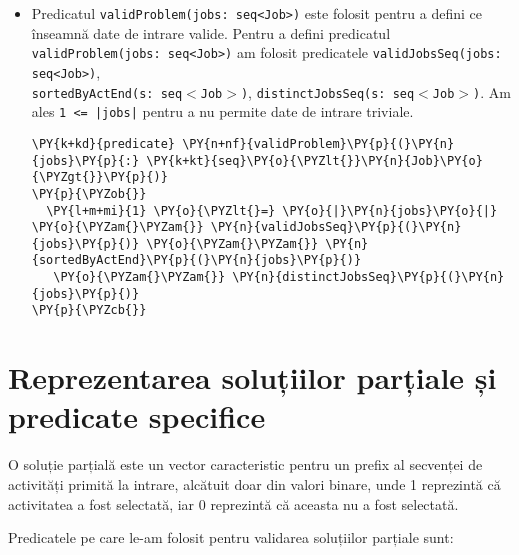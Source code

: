 \begin{itemize}
\begin{Verbatim}[commandchars=\\\{\}, fontsize=\footnotesize]
\PY{p}{\PYZcb{}}
\end{Verbatim}
\item Predicatul \texttt{validProblem(jobs: seq<Job>)} este folosit pentru a defini ce înseamnă date de intrare valide. Pentru a defini predicatul \texttt{validProblem(jobs: seq<Job>)} am folosit predicatele \texttt{validJobsSeq(jobs: seq<Job>)}, \\\texttt{sortedByActEnd(s: seq$<$Job$>$)}, \texttt{distinctJobsSeq(s: seq$<$Job$>$)}. Am ales \texttt{1 <= |jobs|} pentru a nu permite date de intrare triviale. 

\begin{Verbatim}[commandchars=\\\{\}, fontsize=\footnotesize]
\PY{k+kd}{predicate} \PY{n+nf}{validProblem}\PY{p}{(}\PY{n}{jobs}\PY{p}{:} \PY{k+kt}{seq}\PY{o}{\PYZlt{}}\PY{n}{Job}\PY{o}{\PYZgt{}}\PY{p}{)}
\PY{p}{\PYZob{}}
  \PY{l+m+mi}{1} \PY{o}{\PYZlt{}=} \PY{o}{|}\PY{n}{jobs}\PY{o}{|} \PY{o}{\PYZam{}\PYZam{}} \PY{n}{validJobsSeq}\PY{p}{(}\PY{n}{jobs}\PY{p}{)} \PY{o}{\PYZam{}\PYZam{}} \PY{n}{sortedByActEnd}\PY{p}{(}\PY{n}{jobs}\PY{p}{)}
   \PY{o}{\PYZam{}\PYZam{}} \PY{n}{distinctJobsSeq}\PY{p}{(}\PY{n}{jobs}\PY{p}{)}
\PY{p}{\PYZcb{}}
\end{Verbatim}
\end{itemize}



\section{Reprezentarea soluțiilor parțiale și predicate specifice}

O soluție parțială este un vector caracteristic pentru un prefix al secvenței de activități primită la intrare, alcătuit doar din valori binare, unde 1 reprezintă că activitatea a fost selectată, iar 0 reprezintă că aceasta nu a fost selectată. 

Predicatele pe care le-am folosit pentru validarea soluțiilor parțiale sunt: 

